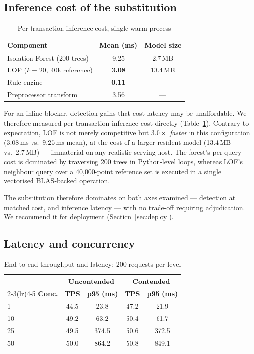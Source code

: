 \documentclass[journal]{IEEEtran}
\begin{document}
\subsection{Inference cost of the substitution}

\begin{table}[t]
\caption{Per-transaction inference cost, single warm process}
\label{tab:infcost}
\centering
\begin{tabular}{lcc}
\toprule
\textbf{Component} & \textbf{Mean (ms)} & \textbf{Model size} \\
\midrule
Isolation Forest (200 trees) & 9.25 & 2.7\,MB \\
LOF ($k=20$, 40k reference)  & \textbf{3.08} & 13.4\,MB \\
Rule engine                  & \textbf{0.11} & --- \\
Preprocessor transform       & 3.56 & --- \\
\bottomrule
\end{tabular}
\end{table}

For an inline blocker, detection gains that cost latency may be
unaffordable. We therefore measured per-transaction inference cost
directly (Table~\ref{tab:infcost}). Contrary to expectation, LOF is not
merely competitive but $3.0\times$ \emph{faster} in this configuration
($3.08$\,ms vs.\ $9.25$\,ms mean), at the cost of a larger resident model
(13.4\,MB vs.\ 2.7\,MB) --- immaterial on any realistic serving host. The
forest's per-query cost is dominated by traversing 200 trees in Python-level
loops, whereas LOF's neighbour query over a 40{,}000-point reference set is
executed in a single vectorised BLAS-backed operation.

The substitution therefore dominates on both axes examined --- detection at
matched cost, and inference latency --- with no trade-off requiring
adjudication. We recommend it for deployment (Section~\ref{sec:deploy}).

\subsection{Latency and concurrency}

\begin{table}[t]
\caption{End-to-end throughput and latency; 200 requests per level}
\label{tab:conc}
\centering
\begin{tabular}{lcccc}
\toprule
& \multicolumn{2}{c}{\textbf{Uncontended}} &
  \multicolumn{2}{c}{\textbf{Contended}} \\
\cmidrule(lr){2-3}\cmidrule(lr){4-5}
\textbf{Conc.} & \textbf{TPS} & \textbf{p95 (ms)} &
\textbf{TPS} & \textbf{p95 (ms)} \\
\midrule
1   & 44.5 & 23.8  & 47.2 & 21.9 \\
10  & 49.2 & 63.2  & 50.4 & 61.7 \\
25  & 49.5 & 374.5 & 50.6 & 372.5 \\
50  & 50.0 & 864.2 & 50.8 & 849.1 \\
\bottomrule
\end{tabular}
\end{table}
\end{document}
